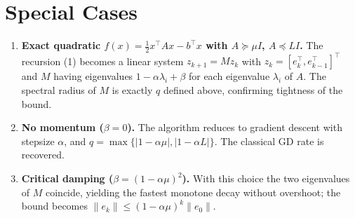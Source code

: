 \documentclass[11pt]{article}
\begin{document}
\section*{Special Cases}
\begin{enumerate}
\item \textbf{Exact quadratic $f(x)=\frac12 x^{\top}Ax-b^{\top}x$ with $A\succeq\mu I$, $A\preceq L I$.}  
The recursion (1) becomes a linear system $z_{k+1}=Mz_{k}$ with $z_{k}=[e_{k}^{\top},e_{k-1}^{\top}]^{\top}$ and $M$ having eigenvalues $1-\alpha\lambda_{i}+\beta$ for each eigenvalue $\lambda_{i}$ of $A$.  The spectral radius of $M$ is exactly $q$ defined above, confirming tightness of the bound.

\item \textbf{No momentum ($\beta=0$).}  
The algorithm reduces to gradient descent with stepsize $\alpha$, and $q=\max\{|1-\alpha\mu|,|1-\alpha L|\}$.  The classical GD rate is recovered.

\item \textbf{Critical damping ($\beta=(1-\alpha\mu)^{2}$).}  
With this choice the two eigenvalues of $M$ coincide, yielding the fastest monotone decay without overshoot; the bound becomes $\|e_{k}\|\le (1-\alpha\mu)^{k}\|e_{0}\|$.
\end{enumerate}
\end{document}
